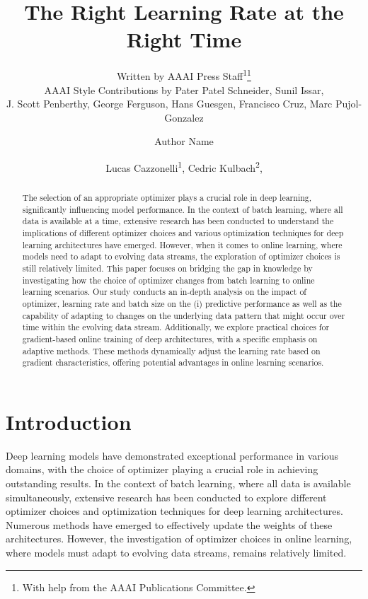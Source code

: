 \documentclass[letterpaper]{article} %
\author{
    Written by AAAI Press Staff\textsuperscript{\rm 1}\thanks{With help from the AAAI Publications Committee.}\\
    AAAI Style Contributions by Pater Patel Schneider,
    Sunil Issar,\\
    J. Scott Penberthy,
    George Ferguson,
    Hans Guesgen,
    Francisco Cruz\equalcontrib,
    Marc Pujol-Gonzalez\equalcontrib}
\author{
    Author Name
}
\title{The Right Learning Rate at the Right Time}
\author{
    Lucas Cazzonelli\textsuperscript{\rm 1},
    Cedric Kulbach\textsuperscript{\rm 2},
}
\begin{document}
\maketitle


\begin{abstract}

	\noindent The selection of an appropriate optimizer plays a crucial role in deep learning, significantly influencing model performance.
	In the context of batch learning, where all data is available at a time, extensive research has been conducted to understand the implications of different optimizer choices and various optimization techniques for deep learning architectures have emerged.
	However, when it comes to online learning, where models need to adapt to evolving data streams, the exploration of optimizer choices is still relatively limited. 
	This paper focuses on bridging the gap in knowledge by investigating how the choice of optimizer  changes from batch learning to online learning scenarios.
	Our study conducts an in-depth analysis on the impact of optimizer, learning rate and batch size on the (i) predictive performance as well as the capability of adapting to changes on the underlying data pattern that might occur over time within the evolving data stream.
	Additionally, we explore practical choices for gradient-based online training of deep architectures, with a specific emphasis on adaptive methods.
	These methods dynamically adjust the learning rate based on gradient characteristics, offering potential advantages in online learning scenarios.

\end{abstract}

\section{Introduction}
Deep learning models have demonstrated exceptional performance in various domains, with the choice of optimizer playing a crucial role in achieving outstanding results.
In the context of batch learning, where all data is available simultaneously, extensive research has been conducted to explore different optimizer choices and optimization techniques for deep learning architectures.
Numerous methods have emerged to effectively update the weights of these architectures.
However, the investigation of optimizer choices in online learning, where models must adapt to evolving data streams, remains relatively limited.
\end{document}
